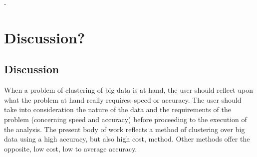 \documentclass[10pt,a4paper,twoside]{report}
\begin{document}
\printglossary
\cleardoublepage

%
\setcounter{page}{1}







-

\chapter{Discussion?}
\label{chapter:discussion}

\section{Discussion}

When a problem of clustering of big data is at hand, the user should reflect upon what the problem at hand really requires: speed or accuracy. The user should take into consideration the nature of the data and the requirements of the problem (concerning speed and accuracy) before proceeding to the execution of the analysis. The present body of work reflects a method of clustering over big data using a high accuracy, but also high cost, method. Other methods offer the opposite, low cost, low to average accuracy. 



\end{document}
